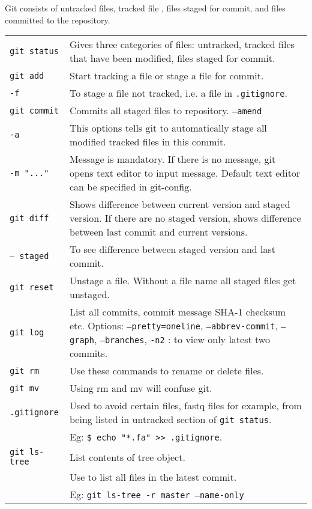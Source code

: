 Git consists of untracked files, tracked file , files staged for commit, and files committed to the repository. \\
\begin{tabularx}{\linewidth}{lX}
\texttt{git status} & Gives three categories of files: untracked, tracked files that have been modified, files staged for commit.\\
\texttt{git add} & Start tracking a file or stage a file for commit.\\
\texttt{-f} & To stage a file not tracked, i.e. a file in \texttt{.gitignore}.\\
\texttt{git commit} & Commits all staged files to repository. \texttt{--amend}\\
\texttt{-a} & This options tells git to automatically stage all modified tracked files in this commit.\\
\texttt{-m "..."} & Message is mandatory. If there is no message, git opens text editor to input message. Default text editor can be specified in git-config.\\
\texttt{git diff} & Shows difference between current version and staged version. If there are no staged version, shows difference between last commit and current versions.\\
\texttt{-- staged} & To see difference between staged version and last commit.\\
\texttt{git reset} & Unstage a file. Without a file name all staged files get unstaged.\\
\texttt{git log} & List all commits, commit message SHA-1 checksum etc. Options: \texttt{--pretty=oneline}, \texttt{--abbrev-commit}, \texttt{--graph}, \texttt{--branches}, \texttt{-n2} : to view only latest two commits.\\
\texttt{git rm} & Use these commands to rename or delete files.\\
\texttt{git mv} & Using rm and mv will confuse git.\\
\texttt{.gitignore} & Used to avoid certain files, fastq files for example, from being listed in untracked section of \texttt{git status}.\\
 & Eg: \texttt{\$ echo "*.fa" >> .gitignore}.\\
\texttt{git ls-tree} & List contents of tree object.\\
 & Use to list all files in the latest commit.\\
 & Eg: \texttt{git ls-tree -r master --name-only}\\
\hline
\end{tabularx}

